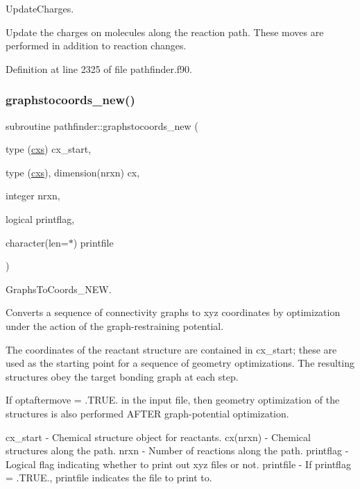 Update\+Charges. 

Update the charges on molecules along the reaction path. These moves are performed in addition to reaction changes. 

Definition at line 2325 of file pathfinder.\+f90.

\mbox{\label{namespacepathfinder_a8e06d604a02f2565abaed3711befb4f3}} 
\subsubsection{\texorpdfstring{graphstocoords\+\_\+new()}{graphstocoords\_new()}}
{\footnotesize\ttfamily subroutine pathfinder\+::graphstocoords\+\_\+new (\begin{DoxyParamCaption}\item[{type (\mbox{\hyperlink{structchemstr_1_1cxs}{cxs}})}]{cx\+\_\+start,  }\item[{type (\mbox{\hyperlink{structchemstr_1_1cxs}{cxs}}), dimension(nrxn)}]{cx,  }\item[{integer}]{nrxn,  }\item[{logical}]{printflag,  }\item[{character(len=$\ast$)}]{printfile }\end{DoxyParamCaption})}



Graphs\+To\+Coords\+\_\+\+N\+EW. 

Converts a sequence of connectivity graphs to xyz coordinates by optimization under the action of the graph-\/restraining potential.

The coordinates of the reactant structure are contained in cx\+\_\+start; these are used as the starting point for a sequence of geometry optimizations. The resulting structures obey the target bonding graph at each step.

If optaftermove = .T\+R\+UE. in the input file, then geometry optimization of the structures is also performed A\+F\+T\+ER graph-\/potential optimization.

cx\+\_\+start -\/ Chemical structure object for reactants. cx(nrxn) -\/ Chemical structures along the path. nrxn -\/ Number of reactions along the path. printflag -\/ Logical flag indicating whether to print out xyz files or not. printfile -\/ If printflag = .T\+R\+UE., printfile indicates the file to print to. 


